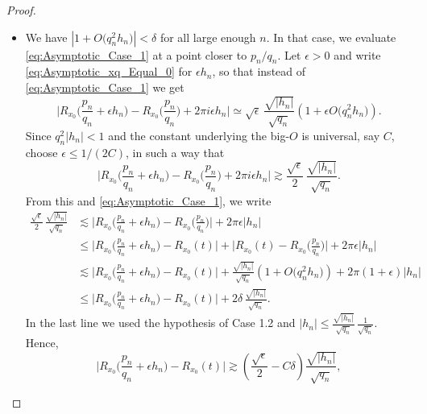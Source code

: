 \documentclass[11pt,reqno]{amsart}
\theoremstyle{definition}
\begin{document}
\begin{proof}
\begin{itemize}
\begin{itemize}
	\item[\textbf{Case 1.2.}] We have $\left|  1 + O\big( q_n^2 h_n \big) \right| < \delta$ for all large enough $n$.
	In that case, we evaluate \eqref{eq:Asymptotic_Case_1} at a point closer to $p_n/q_n$.
	Let $\epsilon > 0$ and write \eqref{eq:Asymptotic_xq_Equal_0} for $\epsilon h_n$, so that instead of  \eqref{eq:Asymptotic_Case_1} we get
	\begin{equation}
\Big|   R_{x_0} \Big( \frac{p_n}{q_n} + \epsilon h_n \Big)  - R_{x_0}\Big( \frac{p_n}{q_n} \Big) + 2\pi i \epsilon h_n \Big|   
 \simeq \sqrt{\epsilon} \, \frac{\sqrt{|h_n|}}{\sqrt{q_n}} \left(  1 + \epsilon O\big( q_n^2 h_n \big) \right).
\end{equation}
Since $q_n^2 |h_n| < 1$ and the constant underlying the big-$O$ is universal, say $C$, choose $\epsilon \leq 1/(2C)$, in such a way that 
\begin{equation}
\Big| R_{x_0} \Big( \frac{p_n}{q_n} + \epsilon h_n \Big)  - R_{x_0}\Big( \frac{p_n}{q_n} \Big) + 2\pi i \epsilon h_n  \Big|   
\gtrsim  \frac{\sqrt{\epsilon}}{2} \, \frac{\sqrt{|h_n|}}{\sqrt{q_n}}.
\end{equation}
From this and \eqref{eq:Asymptotic_Case_1}, we write
\begin{equation}
\begin{split}
\frac{\sqrt{\epsilon}}{2} \, \frac{\sqrt{|h_n|}}{\sqrt{q_n}} 
& \lesssim \Big| R_{x_0} \Big( \frac{p_n}{q_n} + \epsilon h_n \Big)  - R_{x_0}\Big( \frac{p_n}{q_n} \Big) \Big| + 2\pi \epsilon |h_n|  \\
& \leq \Big| R_{x_0} \Big( \frac{p_n}{q_n} + \epsilon h_n \Big)  - R_{x_0}( t ) \Big| + \Big| R_{x_0} ( t )  - R_{x_0}\Big( \frac{p_n}{q_n} \Big) \Big| + 2\pi \epsilon |h_n| \\
& \lesssim \Big| R_{x_0} \Big( \frac{p_n}{q_n} + \epsilon h_n \Big)  - R_{x_0}( t ) \Big| + \frac{\sqrt{|h_n|}}{\sqrt{q_n}} \left(  1 + O\big( q_n^2 h_n \big) \right) + 2\pi (1 +  \epsilon) |h_n| \\
& \leq \Big| R_{x_0} \Big( \frac{p_n}{q_n} + \epsilon h_n \Big)  - R_{x_0}( t ) \Big| + 2\delta\, \frac{\sqrt{|h_n|}}{\sqrt{q_n}}.
\end{split}
\end{equation} 
In the last line we used the hypothesis of Case 1.2 and $|h_n| \leq \frac{\sqrt{|h_n|}}{\sqrt{q_n}} \, \frac{1}{\sqrt{q_n}}$.
Hence, 
 \begin{equation}
 \Big| R_{x_0} \Big( \frac{p_n}{q_n} + \epsilon h_n \Big)  - R_{x_0}( t ) \Big| 
 \gtrsim \left(  \frac{\sqrt{\epsilon}}{2}  - C\delta \right)   \frac{\sqrt{|h_n|}}{\sqrt{q_n}},

\end{equation}
\end{itemize}
\end{itemize}
\end{proof}
\end{document}
